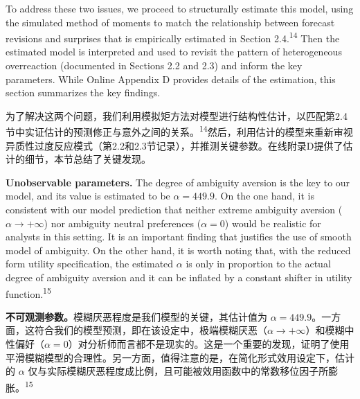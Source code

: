 \documentclass[12pt,a4paper]{article}
\newenvironment{original}
  {\par\medskip\noindent\ignorespaces}
  {\par\medskip}
\newenvironment{translation}
  {\par\noindent{\color{transblue}\ignorespaces}}
  {\par\bigskip}
\begin{document}
\begin{original}
To address these two issues, we proceed to structurally estimate this model, using the simulated method of moments to match the relationship between forecast revisions and surprises that is empirically estimated in Section 2.4.\textsuperscript{14} Then the estimated model is interpreted and used to revisit the pattern of heterogeneous overreaction (documented in Sections 2.2 and 2.3) and inform the key parameters. While Online Appendix D provides details of the estimation, this section summarizes the key findings.
\end{original}
\begin{translation}
为了解决这两个问题，我们利用模拟矩方法对模型进行结构性估计，以匹配第2.4节中实证估计的预测修正与意外之间的关系。\textsuperscript{14}然后，利用估计的模型来重新审视异质性过度反应模式（第2.2和2.3节记录），并推测关键参数。在线附录D提供了估计的细节，本节总结了关键发现。
\end{translation}

\begin{original}
\textbf{Unobservable parameters.} The degree of ambiguity aversion is the key to our model, and its value is estimated to be $\alpha = 449.9$. On the one hand, it is consistent with our model prediction that neither extreme ambiguity aversion ($\alpha \to +\infty$) nor ambiguity neutral preferences ($\alpha = 0$) would be realistic for analysts in this setting. It is an important finding that justifies the use of smooth model of ambiguity. On the other hand, it is worth noting that, with the reduced form utility specification, the estimated $\alpha$ is only in proportion to the actual degree of ambiguity aversion and it can be inflated by a constant shifter in utility function.\textsuperscript{15}
\end{original}
\begin{translation}
\textbf{不可观测参数。}模糊厌恶程度是我们模型的关键，其估计值为 $\alpha = 449.9$。一方面，这符合我们的模型预测，即在该设定中，极端模糊厌恶（$\alpha \to +\infty$）和模糊中性偏好（$\alpha = 0$）对分析师而言都不是现实的。这是一个重要的发现，证明了使用平滑模糊模型的合理性。另一方面，值得注意的是，在简化形式效用设定下，估计的 $\alpha$ 仅与实际模糊厌恶程度成比例，且可能被效用函数中的常数移位因子所膨胀。\textsuperscript{15}
\end{translation}
\end{document}
